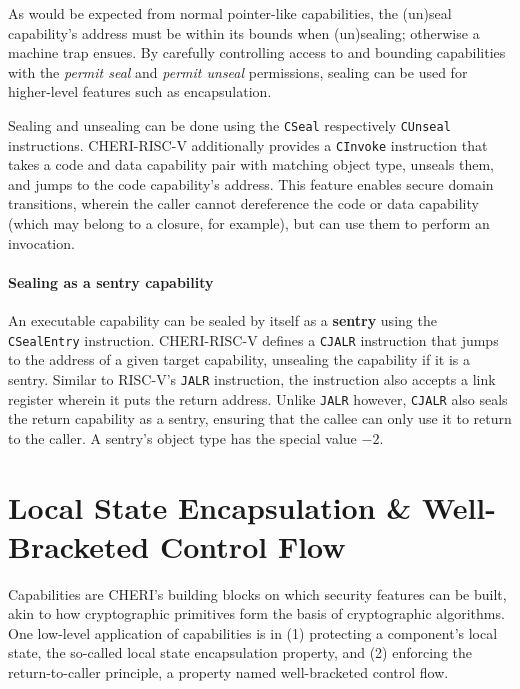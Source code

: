 \documentclass[main.tex]{subfiles}
\begin{document}
As would be expected from normal pointer-like capabilities, the (un)seal capability's address must be within its bounds when (un)sealing; otherwise a machine trap ensues. By carefully controlling access to and bounding capabilities with the \emph{permit seal} and \emph{permit unseal} permissions, sealing can be used for higher-level features such as encapsulation.

Sealing and unsealing can be done using the \texttt{CSeal} respectively \texttt{CUnseal} instructions. CHERI-RISC-V additionally provides a \texttt{CInvoke} instruction that takes a code and data capability pair with matching object type, unseals them, and jumps to the code capability's address. This feature enables secure domain transitions, wherein the caller cannot dereference the code or data capability (which may belong to a closure, for example), but can use them to perform an invocation.

\paragraph{Sealing as a sentry capability} An executable capability can be sealed by itself as a \textbf{\gls{sentry}} using the \texttt{CSealEntry} instruction. CHERI-RISC-V defines a \texttt{CJALR} instruction that jumps to the address of a given target capability, unsealing the capability if it is a \gls{sentry}. Similar to RISC-V's \texttt{JALR} instruction, the instruction also accepts a link register wherein it puts the return address. Unlike \texttt{JALR} however, \texttt{CJALR} also seals the return capability as a \gls{sentry}, ensuring that the callee can only use it to return to the caller. A \gls{sentry}'s object type has the special value $-2$.

\section{Local State Encapsulation \& Well-Bracketed Control Flow}
Capabilities are CHERI’s building blocks on which security features can be built, akin to how cryptographic primitives form the basis of cryptographic algorithms. One low-level application of capabilities is in (1) protecting a component's local state, the so-called local state encapsulation property, and (2) enforcing the return-to-caller principle, a property named well-bracketed control flow.
\end{document}
